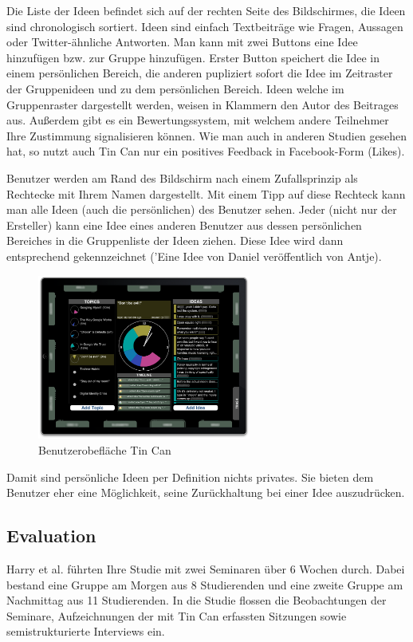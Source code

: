 Die Liste der Ideen befindet sich auf der rechten Seite des Bildschirmes, die
Ideen sind chronologisch sortiert. Ideen sind einfach Textbeiträge wie Fragen,
Aussagen oder Twitter-ähnliche Antworten. Man kann mit zwei Buttons eine Idee
hinzufügen bzw. zur Gruppe hinzufügen. Erster Button speichert die Idee in einem
persönlichen Bereich, die anderen pupliziert sofort die Idee im Zeitraster der
Gruppenideen und zu dem persönlichen Bereich. Ideen welche im Gruppenraster
dargestellt werden, weisen in Klammern den Autor des Beitrages aus. Außerdem
gibt es ein Bewertungssystem, mit welchem andere Teilnehmer Ihre Zustimmung
signalisieren können. Wie man auch in anderen Studien gesehen hat, so nutzt auch
Tin Can nur ein positives Feedback in Facebook-Form (Likes).

Benutzer werden am Rand des Bildschirm nach einem Zufallsprinzip als Rechtecke
mit Ihrem Namen dargestellt. Mit einem Tipp auf diese Rechteck kann man alle
Ideen (auch die persönlichen) des Benutzer sehen. Jeder (nicht nur der
Ersteller) kann eine Idee eines anderen Benutzer aus dessen persönlichen
Bereiches in die Gruppenliste der Ideen ziehen. Diese Idee wird dann
entsprechend gekennzeichnet ('Eine Idee von Daniel veröffentlich von Antje).

\begin{figure}[htp]
\centering
\includegraphics[width=7cm]{tincan_ui.png}
\caption{Benutzerobefläche Tin Can}
\end{figure}

Damit sind persönliche Ideen per Definition nichts privates. Sie bieten dem
Benutzer eher eine Möglichkeit, seine Zurückhaltung bei einer Idee auszudrücken.


\subsection{Evaluation}
Harry et al. führten Ihre Studie mit zwei Seminaren über 6 Wochen durch. Dabei
bestand eine Gruppe am Morgen aus 8 Studierenden und eine zweite Gruppe am
Nachmittag aus 11 Studierenden. In die Studie flossen die Beobachtungen der
Seminare, Aufzeichnungen der mit Tin Can erfassten Sitzungen sowie
semistrukturierte Interviews ein.

